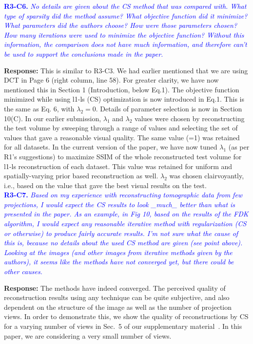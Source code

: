 \documentclass{article}
\begin{document}
\textcolor{blue}{\textbf{R3-C6.}\textit{ No details are given about the CS method that was compared with. What type of sparsity did the method assume? What objective function did it minimize? What parameters did the authors choose? How were those parameters chosen? How many iterations were used to minimize the objective function? Without this information, the comparison does not have much information, and therefore can't be used to support the conclusions made in the paper.}}

\textbf{Response:} This is similar to R3-C3. We had earlier mentioned that we are using DCT in Page 6 (right column, line 58). For greater clarity, we have now mentioned this in Section 1 (Introduction, below Eq.1).
The objective function minimized while using l1-ls (CS) optimization is now introduced in Eq.1. This is the same as Eq. 6,  with $\lambda_2 = 0$.
Details of parameter selection is now in Section 10(C).
In our earlier submission, $\lambda_1$ and $\lambda_2$ values were chosen by reconstructing the test volume by sweeping through a range of values and selecting the set of values that gave a reasonable visual quality. The same value (=1) was retained for all datasets. In the current version of the paper, we have now tuned $\lambda_1$ (as per R1's suggestions) to maximize SSIM of the whole reconstructed test volume for l1-ls reconstruction of each dataset. This value was retained for uniform and spatially-varying prior based reconstruction as well. $\lambda_2$ was chosen clairvoyantly,  i.e., based on the value that gave the best visual results on the test.\\

\textcolor{blue}{\textbf{R3-C7.}\textit{ Based on my experience with reconstructing tomographic data from few projections, I would expect the CS results to look \_much\_ better than what is presented in the paper. As an example, in Fig 10, based on the results of the FDK algorithm, I would expect any reasonable iterative method with regularization (CS or otherwise) to produce fairly accurate results. I'm not sure what the cause of this is, because no details about the used CS method are given (see point above). Looking at the images (and other images from iterative methods given by the authors), it seems like the methods have not converged yet, but there could be other causes.}}

\textbf{Response:} The methods have indeed converged. The perceived quality of reconstruction results using any technique can be quite subjective, and also dependent on the structure of the image as well as the number of projection views. In order to demonstrate this, we show the quality of reconstructions by CS for a varying number of views in Sec.~5 of our supplementary material~\cite{supp_paper}. In this paper, we are considering a very small number of views.  
\end{document}
